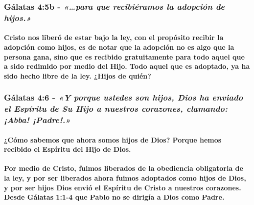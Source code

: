 \documentclass[11a pt,twoside]{article}
\newcommand{\scripture}[1]{%
  {\fontsize{12pt}{16pt}\selectfont\ScriptureFont\itshape #1}%
}
\let\oldsubsubsection\subsubsection
\renewcommand{\subsubsection}{\needspace{4\baselineskip}\oldsubsubsection}
\let\oldparagraph\paragraph
\renewcommand{\paragraph}{\needspace{3\baselineskip}\oldparagraph}
\begin{document}
\subsubsection{\texorpdfstring{Gálatas 4:5b -
\scripture{«…para que recibiéramos la adopción de hijos.»}}{Gálatas 4:5b - }}\label{guxe1latas-45b---para-que-recibiuxe9ramos-la-adopciuxf3n-de-hijos.}

\paragraph{Cristo nos liberó de estar bajo la ley, con el propósito
recibir la adopción como hijos, es de notar que la adopción no es algo
que la persona gana, sino que es recibido gratuitamente para todo aquel
que a sido redimido por medio del Hijo. Todo aquel que es adoptado, ya
ha sido hecho libre de la ley. ¿Hijos de
quién?}\label{cristo-nos-liberuxf3-de-estar-bajo-la-ley-con-el-propuxf3sito-recibir-la-adopciuxf3n-como-hijos-es-de-notar-que-la-adopciuxf3n-no-es-algo-que-la-persona-gana-sino-que-es-recibido-gratuitamente-para-todo-aquel-que-a-sido-redimido-por-medio-del-hijo.-todo-aquel-que-es-adoptado-ya-ha-sido-hecho-libre-de-la-ley.-hijos-de-quiuxe9n}

\subsubsection{\texorpdfstring{Gálatas 4:6 -
\scripture{«Y porque ustedes son hijos, Dios ha enviado el Espíritu de Su Hijo a nuestros corazones, clamando: ¡Abba! ¡Padre!.»}}{Gálatas 4:6 - }}\label{guxe1latas-46---y-porque-ustedes-son-hijos-dios-ha-enviado-el-espuxedritu-de-su-hijo-a-nuestros-corazones-clamando-abba-padre.}

\paragraph{¿Cómo sabemos que ahora somos hijos de Dios? Porque hemos
recibido el Espíritu del Hijo de
Dios.}\label{cuxf3mo-sabemos-que-ahora-somos-hijos-de-dios-porque-hemos-recibido-el-espuxedritu-del-hijo-de-dios.}

\paragraph{Por medio de Cristo, fuimos liberados de la obediencia
obligatoria de la ley, y por ser liberados ahora fuimos adoptados como
hijos de Dios, y por ser hijos Dios envió el Espíritu de Cristo a
nuestros corazones. Desde Gálatas 1:1-4 que Pablo no se dirigía a Dios
como
Padre.}\label{por-medio-de-cristo-fuimos-liberados-de-la-obediencia-obligatoria-de-la-ley-y-por-ser-liberados-ahora-fuimos-adoptados-como-hijos-de-dios-y-por-ser-hijos-dios-enviuxf3-el-espuxedritu-de-cristo-a-nuestros-corazones.-desde-guxe1latas-11-4-que-pablo-no-se-diriguxeda-a-dios-como-padre.}
\end{document}
